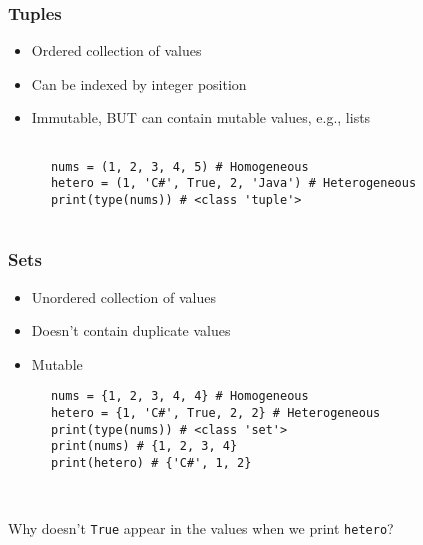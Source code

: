 \documentclass[10pt]{beamer}
\begin{document}
\begin{frame}[fragile]
  \frametitle{Tuples}
   
   \begin{itemize}
     \item Ordered collection of values
     \item Can be indexed by integer position
     \item Immutable, BUT can contain mutable values, e.g., lists
   
   \end{itemize}   
   

  
   \begin{verbatim}
  
      nums = (1, 2, 3, 4, 5) # Homogeneous
      hetero = (1, 'C#', True, 2, 'Java') # Heterogeneous
      print(type(nums)) # <class 'tuple'>
   
   \end{verbatim}
  
  
\end{frame}

\begin{frame}[fragile]
  \frametitle{Sets}
   
      
   \begin{itemize}
     \item Unordered collection of values
     \item Doesn't contain duplicate values
     \item Mutable
   
   \end{itemize} 

  
   \begin{verbatim}
      nums = {1, 2, 3, 4, 4} # Homogeneous
      hetero = {1, 'C#', True, 2, 2} # Heterogeneous
      print(type(nums)) # <class 'set'>
      print(nums) # {1, 2, 3, 4}
      print(hetero) # {'C#', 1, 2}
   
   
   \end{verbatim}
   
   Why doesn't \texttt{True} appear in the values when we print \texttt{hetero}?
  
  
\end{frame}
\end{document}
